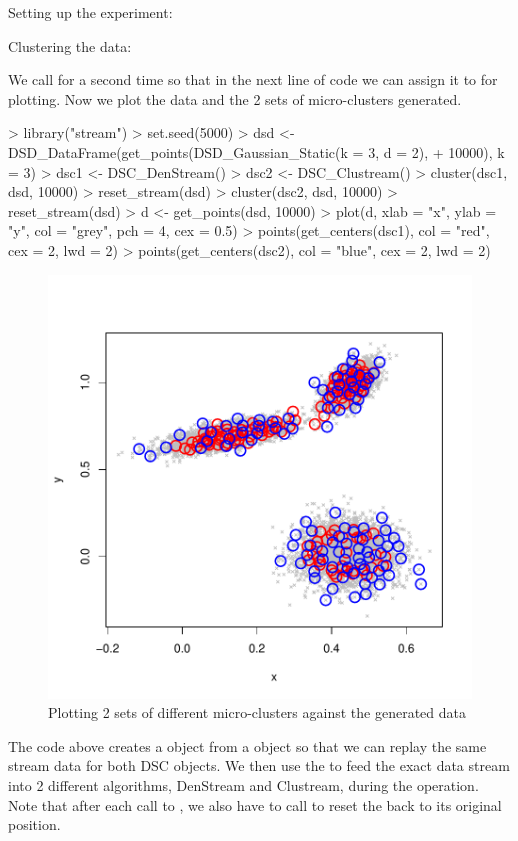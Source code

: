 \documentclass[nojss]{jss}
\begin{document}
Setting up the experiment:


Clustering the data:


We call  for a second time so that in the next line of code we can assign it to  for plotting. Now we plot the data and the 2 sets of micro-clusters generated.

\begin{Schunk}
\begin{Sinput}
> library("stream")
> set.seed(5000)
> dsd <- DSD_DataFrame(get_points(DSD_Gaussian_Static(k = 3, d = 2), 
+     10000), k = 3)
> dsc1 <- DSC_DenStream()
> dsc2 <- DSC_Clustream()
> cluster(dsc1, dsd, 10000)
> reset_stream(dsd)
> cluster(dsc2, dsd, 10000)
> reset_stream(dsd)
> d <- get_points(dsd, 10000)
> plot(d, xlab = "x", ylab = "y", col = "grey", pch = 4, cex = 0.5)
> points(get_centers(dsc1), col = "red", cex = 2, lwd = 2)
> points(get_centers(dsc2), col = "blue", cex = 2, lwd = 2)
\end{Sinput}
\end{Schunk}

\begin{figure}
\centering
\includegraphics[width=.5\linewidth]{stream-plot3}
\caption{Plotting 2 sets of different micro-clusters against the generated data}
\label{figure:plot3}
\end{figure}

The code above creates a  object from a  object so that we can replay the same stream data for both DSC objects. We then use the  to feed the exact data stream into 2 different algorithms, DenStream and Clustream, during the  operation. Note that after each call to , we also have to call  to reset the  back to its original position.
\end{document}
